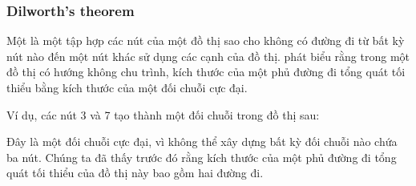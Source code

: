 \subsubsection{Dilworth's theorem}


Một  là một tập hợp các nút của một đồ thị
sao cho không có đường đi
từ bất kỳ nút nào đến một nút khác
sử dụng các cạnh của đồ thị.
 phát biểu rằng
trong một đồ thị có hướng không chu trình, kích thước của
một phủ đường đi tổng quát tối thiểu
bằng kích thước của một đối chuỗi cực đại.

Ví dụ, các nút 3 và 7 tạo thành một đối chuỗi
trong đồ thị sau:

\begin{center}
\end{center}

Đây là một đối chuỗi cực đại, vì không thể
xây dựng bất kỳ đối chuỗi nào chứa ba nút.
Chúng ta đã thấy trước đó rằng kích thước của một phủ
đường đi tổng quát tối thiểu của đồ thị này bao gồm hai đường đi.
